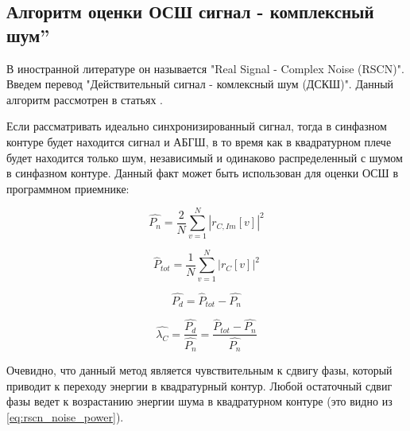 \subsection{Алгоритм оценки ОСШ
 сигнал - комплексный шум\textquotedblright}

В иностранной литературе он называется "Real Signal - Complex Noise (RSCN)". Введем перевод
"Действительный сигнал - комлексный шум (ДСКШ)".
Данный алгоритм рассмотрен в статьях \cite{badke_rscn, presti_insidegnss, presti_ieee}.

Если рассматривать идеально синхронизированный сигнал, тогда в синфазном контуре будет
находится сигнал и АБГШ, в то время как в квадратурном плече будет находится только шум,
независимый и одинаково распределенный с шумом в синфазном контуре. Данный факт может
быть использован для оценки ОСШ в программном приемнике:
\begin{center}
\begin{equation}
	\label{eq:rscn_noise_power}
	\hat{P_n} = \frac{2}{N}\sum^N_{v=1}|r_{C,Im}[v]|^2
\end{equation}
\end{center}

\begin{center}
\begin{equation}
	\label{eq:rscn_total_power}
	\hat{P}_{tot} = \frac{1}{N}\sum^N_{v=1}|r_{C}[v]|^2
\end{equation}
\end{center}

\begin{center}
\begin{equation}
	\label{eq:rscn_data_power}
	\hat{P_d} = \hat{P}_{tot} - \hat{P_n}
\end{equation}
\end{center}

\begin{center}
\begin{equation}
	\label{eq:rscn_snr}
	\hat{\lambda_C} = \frac{\hat{P_d}}{\hat{P_n}} = \frac{\hat{P}_{tot} - \hat{P_n}}{\hat{P_n}} 
\end{equation}
\end{center}

Очевидно, что данный метод является чувствительным к сдвигу фазы, который приводит к переходу энергии
в квадратурный контур. Любой остаточный сдвиг фазы ведет к возрастанию энергии шума в квадратурном
контуре (это видно из \ref{eq:rscn_noise_power}).

\newpage
